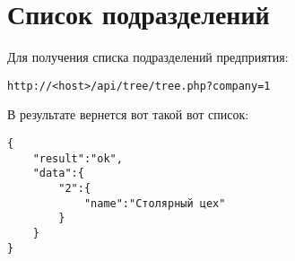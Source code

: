 \section{Список подразделений}
\par

Для получения списка подразделений предприятия: \\
\begin{Verbatim}[frame=single]
http://<host>/api/tree/tree.php?company=1
\end{Verbatim}

В результате вернется вот такой вот список:
\begin{Verbatim}[frame=single]
{
    "result":"ok",
    "data":{
        "2":{
            "name":"Столярный цех"
        }
    }
}
\end{Verbatim}